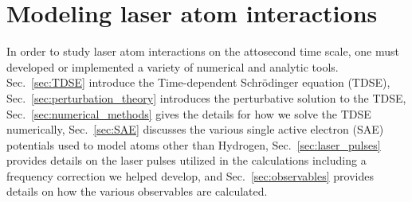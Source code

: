 \chapter{Modeling laser atom interactions}
\label{cha:numberic_methods}
In order to study laser atom interactions on the attosecond time scale, one must developed or implemented a variety of numerical and analytic tools. Sec.~\ref{sec:TDSE} introduce the Time-dependent Schr\"odinger equation (TDSE), Sec.~\ref{sec:perturbation_theory} introduces the perturbative solution to the TDSE, Sec.~\ref{sec:numerical_methods} gives the details for how we solve the TDSE numerically, Sec.~\ref{sec:SAE} discusses the various single active electron (SAE) potentials used to model atoms other than Hydrogen, Sec.~\ref{sec:laser_pulses} provides details on the laser pulses utilized in the calculations including a frequency correction we helped develop, and Sec.~\ref{sec:observables} provides details on how the various observables are calculated.

